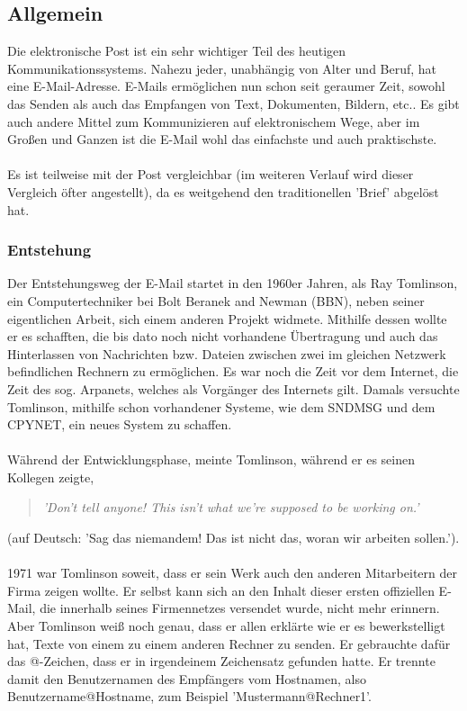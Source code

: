 \documentclass[12pt,a4paper]{report}
\begin{document}
\begin{onehalfspace}
\section{Allgemein}
Die elektronische Post ist ein sehr wichtiger Teil des heutigen Kommunikationssystems. Nahezu jeder, unabhängig von Alter und Beruf, hat eine E-Mail-Adresse. E-Mails ermöglichen nun schon seit geraumer Zeit, sowohl das Senden als auch das Empfangen von Text, Dokumenten, Bildern, etc.. Es gibt auch andere Mittel zum Kommunizieren auf elektronischem Wege, aber im Großen und Ganzen ist die E-Mail wohl das einfachste und auch praktischste.\\\\
Es ist teilweise mit der Post vergleichbar (im weiteren Verlauf wird dieser Vergleich öfter angestellt), da es weitgehend den traditionellen 'Brief' abgelöst hat.  
\subsubsection{Entstehung}\label{sssec:Entstehung}
Der Entstehungsweg der E-Mail startet in den 1960er Jahren, als Ray Tomlinson, ein Computertechniker bei Bolt Beranek and Newman (BBN), neben seiner eigentlichen Arbeit, sich einem anderen Projekt widmete. Mithilfe dessen wollte er es schafften, die bis dato noch nicht vorhandene Übertragung und auch das Hinterlassen von Nachrichten bzw. Dateien zwischen zwei im gleichen Netzwerk befindlichen Rechnern zu ermöglichen. Es war noch die Zeit vor dem Internet, die Zeit des sog. Arpanets, welches als Vorgänger des Internets gilt. Damals versuchte Tomlinson, mithilfe schon vorhandener Systeme, wie dem SNDMSG und dem CPYNET, ein neues System zu schaffen.\\\\

Während der Entwicklungsphase, meinte Tomlinson, während er es seinen Kollegen zeigte, 
\begin{quote}
\textit{'Don't tell anyone! This isn't what we're supposed to be working on.'}
\end{quote}
(auf Deutsch: 'Sag das niemandem! Das ist nicht das, woran wir arbeiten sollen.').\\\\

1971 war Tomlinson soweit, dass er sein Werk auch den anderen Mitarbeitern der Firma zeigen wollte. Er selbst kann sich an den Inhalt dieser ersten offiziellen E-Mail, die innerhalb seines Firmennetzes versendet wurde, nicht mehr erinnern. Aber Tomlinson weiß noch genau, dass er allen erklärte wie er es bewerkstelligt hat, Texte von einem zu einem anderen Rechner zu senden. Er gebrauchte dafür das @-Zeichen, dass er in irgendeinem Zeichensatz gefunden hatte. Er trennte damit den Benutzernamen des Empfängers vom Hostnamen, also Benutzername@Hostname, zum Beispiel 'Mustermann@Rechner1'. \\


\end{onehalfspace}
\end{document}
